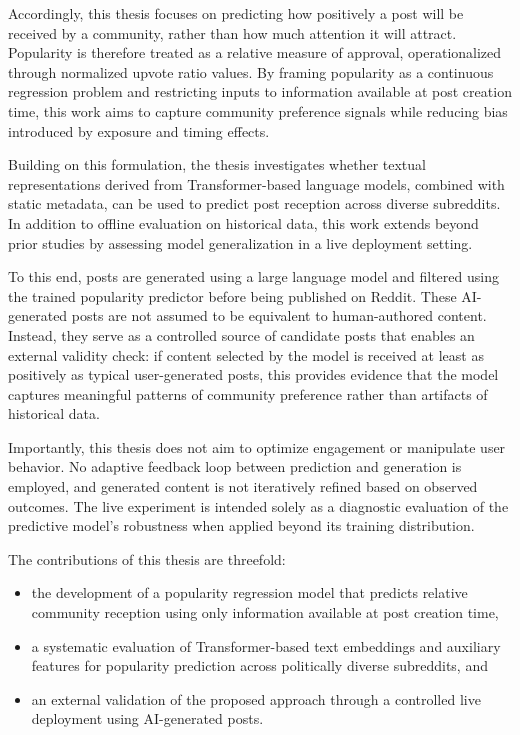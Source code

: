 Accordingly, this thesis focuses on predicting how positively a post will be received by a community, rather than how much attention it will attract. Popularity is therefore treated as a relative measure of approval, operationalized through normalized upvote ratio values. By framing popularity as a continuous regression problem and restricting inputs to information available at post creation time, this work aims to capture community preference signals while reducing bias introduced by exposure and timing effects.

Building on this formulation, the thesis investigates whether textual representations derived from Transformer-based language models, combined with static metadata, can be used to predict post reception across diverse subreddits. In addition to offline evaluation on historical data, this work extends beyond prior studies by assessing model generalization in a live deployment setting.

To this end, posts are generated using a large language model and filtered using the trained popularity predictor before being published on Reddit. These AI-generated posts are not assumed to be equivalent to human-authored content. Instead, they serve as a controlled source of candidate posts that enables an external validity check: if content selected by the model is received at least as positively as typical user-generated posts, this provides evidence that the model captures meaningful patterns of community preference rather than artifacts of historical data.

Importantly, this thesis does not aim to optimize engagement or manipulate user behavior. No adaptive feedback loop between prediction and generation is employed, and generated content is not iteratively refined based on observed outcomes. The live experiment is intended solely as a diagnostic evaluation of the predictive model’s robustness when applied beyond its training distribution.

The contributions of this thesis are threefold:
\begin{itemize}
    \item the development of a popularity regression model that predicts relative community reception using only information available at post creation time,
    \item a systematic evaluation of Transformer-based text embeddings and auxiliary features for popularity prediction across politically diverse subreddits, and
    \item an external validation of the proposed approach through a controlled live deployment using AI-generated posts.
\end{itemize}


